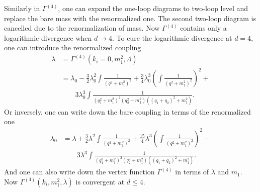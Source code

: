 \documentclass[submission, PhysLectNotes]{SciPost}
\begin{document}
Similarly in $\Gamma^{(4)}$, one can expand the one-loop diagrams to two-loop level and replace the bare mass with the renormalized one. The second two-loop diagram is cancelled due to the renormalization of mass. Now $\Gamma^{(4)}$ contains only a logarithmic divergence when $d \rightarrow 4$. To cure the logarithmic divergence at $d=4$, one can introduce the renormalized coupling
\begin{equation}
	\begin{aligned}
		\lambda &= \Gamma^{(4)}(k_i=0, m_1^2,\Lambda) \\
		&= \lambda_0 - \frac{3}{2}\lambda_0^2 \int \frac{1}{\left(q^2 + m_1^2\right)^2} + \frac{3}{4}\lambda_0^3 \left(\int \frac{1}{\left(q^2 + m_1^2\right)^2} \right)^2 + \\
		& \qquad 3\lambda_0^3 \int \frac{1}{\left(q_1^2+m_1^2\right)^2\left(q_2^2+m_1^2\right)\left(\left(q_1+q_2\right)^2+m_1^2\right)}.
	\end{aligned}
\end{equation} 
Or inversely, one can write down the bare coupling in terms of the renormalized one
\begin{equation}
	\begin{aligned}
		\lambda_0 &= \lambda + \frac{3}{2}\lambda^2 \int \frac{1}{\left(q^2 + m_1^2\right)^2} + \frac{15}{4}\lambda^3 \left(\int \frac{1}{\left(q^2 + m_1^2\right)^2} \right)^2 - \\
		& \qquad 3\lambda^3 \int \frac{1}{\left(q_1^2+m_1^2\right)^2\left(q_2^2+m_1^2\right)\left(\left(q_1+q_2\right)^2+m_1^2\right)}.
	\end{aligned}
\end{equation}
And one can also write down the vertex function $\Gamma^{(4)}$ in terms of $\lambda$ and $m_1$. Now $\Gamma^{(4)}(k_i,m_1^2,\lambda)$ is convergent at $d\leq4$.  
\end{document}
